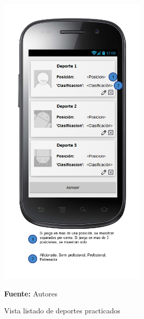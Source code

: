 \begin{figure}[!htb]
  \begin{center}
\includegraphics[width=7cm]{./imagenes/UI/Usuarios/listado_de_deportes_practicados.png}
    \caption{Vista listado de deportes practicados}
    \label{fig:Vista_listado_de_deportes_practicados}
    \textbf{Fuente:}  Autores
  \end{center}
\end{figure}
